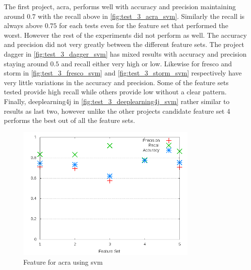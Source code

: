 The first project, acra, performs well with accuracy and precision maintaining around $0.7$ with the recall above in \autoref{fig:test_3_acra_svm}. Similarly the recall is always above $0.75$ for each tests even for the feature set that performed the worst. However the rest of the experiments did not perform as well. The accuracy and precision did not very greatly between the different feature sets. The project dagger in \autoref{fig:test_3_dagger_svm} has mixed results with accuracy and precision staying around $0.5$ and recall either very high or low. Likewise for fresco and storm in \autoref{fig:test_3_fresco_svm} and \autoref{fig:test_3_storm_svm} respectively have very little variations in the accuracy and precision. Some of the feature sets tested provide high recall while others provide low without a clear pattern. Finally, deeplearning4j in \autoref{fig:test_3_deeplearning4j_svm} rather similar to results as last two, however unlike the other projects candidate feature set 4 performs the best out of all the feature sets.



\begin{figure}[!h]
    \centering

        \includegraphics[width=0.8\textwidth]{images/svm/test_3/acra_sample_range}
        \caption{Feature for acra using \gls{svm}}
        \label{fig:test_3_acra_svm}
\end{figure}

